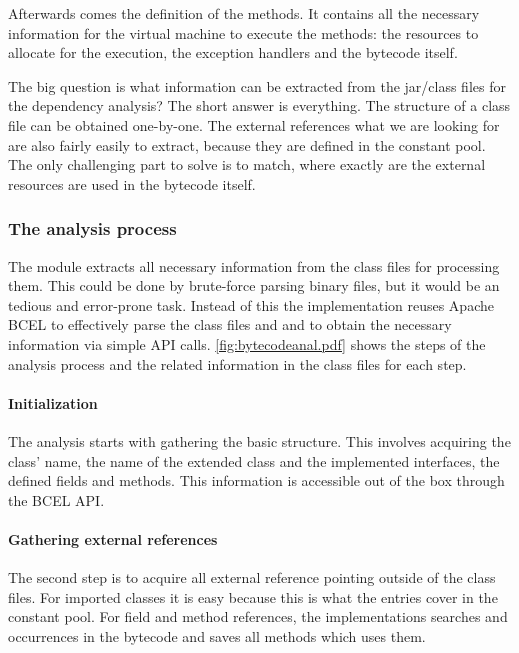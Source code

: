 Afterwards comes the definition of the methods. It contains all the necessary
information for the virtual machine to execute the methods: the resources to 
allocate for the execution, the exception handlers and the bytecode itself. 

The big question is what information can be extracted from the jar/class files
for the dependency analysis? The short answer is everything. The structure of a
class file can be obtained one-by-one. The external references what we are
looking for are also fairly easily to extract, because they are defined in the
constant pool. The only challenging part to solve is to match, where exactly are
the external resources are used in the bytecode itself.


\subsubsection{The analysis process}
The module extracts all necessary information from the class files for processing
them. This could be done by brute-force parsing binary files, but it would be an
tedious and error-prone task. Instead of this the implementation reuses Apache
BCEL to effectively parse the class files and and to obtain the necessary
information via simple API calls.
\autoref{fig:bytecodeanal.pdf} shows the steps of the analysis process and the
related information in the class files for each step. 

\paragraph{Initialization}
The analysis starts with gathering the basic structure. This involves acquiring
the class' name, the name of the extended class and the implemented interfaces,
the defined fields and methods. This information is accessible out of the box
through the BCEL API.  

\paragraph{Gathering external references}
The second step is to acquire all external reference pointing outside of the
class files. For imported classes it is easy because this is what the
 entries cover in the constant pool. For field and method
references, the implementations searches  and
 occurrences in the bytecode and saves all methods 
which uses them.

